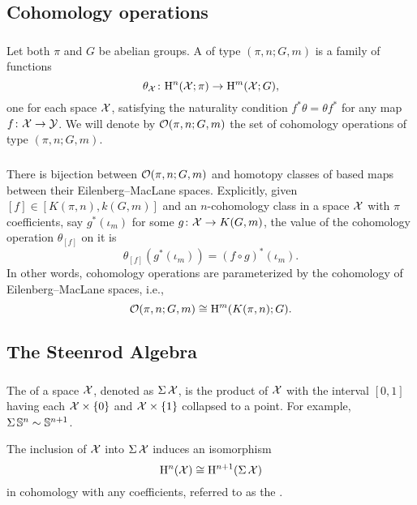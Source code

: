 \subsection{Cohomology operations}

\subsubsection{}
Let both $\pi$ and $G$ be abelian groups.
A  of type $(\pi, n; G, m)$ is a family of functions
\[
\theta_{\mathcal{X}} \colon \mathrm{H}^n(\mathcal{X}; \pi) \to \mathrm{H}^m(\mathcal{X}; G),
\]
one for each space $\mathcal{X}$, satisfying the naturality condition $f^* \theta = \theta f^*$ for any map $f \colon \mathcal{X} \to \mathcal{Y}$.
We will denote by $\mathcal{O}(\pi, n; G,m)$ the set of cohomology operations of type $(\pi, n; G,m)$.

\subsubsection{}
There is bijection between $\mathcal{O}(\pi, n; G,m)$ and homotopy classes of based maps between their Eilenberg--MacLane spaces.
Explicitly, given $[f] \in [K(\pi,n), k(G,m)]$ and an $n$-cohomology class in a space $\mathcal{X}$ with $\pi$ coefficients, say $g^*(\iota_m)$ for some $g \colon \mathcal{X} \to K(G, m)$, the value of the cohomology operation $\theta_{[f]}$ on it is
\[
\theta_{[f]}(g^*(\iota_m)) = (f \circ g)^*(\iota_m).
\]
In other words, cohomology operations are parameterized by the cohomology of Eilenberg--MacLane spaces, i.e.,
\[
\mathcal{O}(\pi, n; G,m) \cong \mathrm{H}^m(K(\pi,n); G).
\]

\subsection{The Steenrod Algebra}\label{ss:steenrod}

\subsubsection{} The  of a space $\mathcal{X}$, denoted as $\operatorname{\Sigma} \mathcal{X}$, is the product of $\mathcal{X}$ with the interval $[0,1]$ having each $\mathcal{X} \times \{0\}$ and $\mathcal{X} \times \{1\}$ collapsed to a point.
For example, $\operatorname{\Sigma} \mathbb{S}^n \sim \mathbb{S}^{n+1}$.

The inclusion of $\mathcal{X}$ into $\operatorname{\Sigma} \mathcal{X}$ induces an isomorphism
\[
\mathrm{H}^n(\mathcal{X}) \cong \mathrm{H}^{n+1}(\operatorname{\Sigma} \mathcal{X})
\]
in cohomology with any coefficients, referred to as the .


